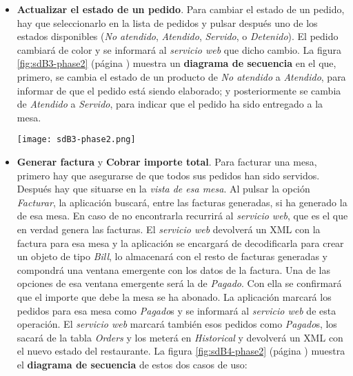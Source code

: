 \begin{itemize}
  \begin{sidewaysfigure}[!h]
    \begin{center}
      \texttt{[image: sdB2-phase2.png]}
      \caption{Diagrama de secuencia del caso de uso \emph{añadir un nuevo
      pedido (manual)}.}
      \label{fig:sdB2-phase2}
    \end{center}
  \end{sidewaysfigure}

\item \textbf{Actualizar el estado de un pedido}. Para cambiar el estado de
un pedido, hay que seleccionarlo en la lista de pedidos y pulsar después uno
de los estados disponibles (\emph{No atendido}, \emph{Atendido},
\emph{Servido}, o \emph{Detenido}). El pedido cambiará de color y se informará
al \emph{servicio web} que dicho cambio.
La figura \ref{fig:sdB3-phase2} (página \pageref{fig:sdB3-phase2}) muestra
un \textbf{diagrama de secuencia} en el que, primero, se cambia el estado de
un producto de \emph{No atendido} a \emph{Atendido}, para informar de que
el pedido está siendo elaborado; y posteriormente se cambia de \emph{Atendido}
a \emph{Servido}, para indicar que el pedido ha sido entregado a la mesa.

  \begin{sidewaysfigure}[!h]
    \begin{center}
      \texttt{[image: sdB3-phase2.png]}
      \caption{Diagrama de secuencia del caso de uso \emph{actualizar
      estado de un pedido} de \emph{No atendido} a \emph{Servido}.}
      \label{fig:sdB3-phase2}
    \end{center}
  \end{sidewaysfigure}

\item \textbf{Generar factura} y  \textbf{Cobrar importe total}. Para
facturar una mesa, primero hay que asegurarse de que todos sus pedidos han
sido servidos. Después hay que situarse en la \emph{vista de esa mesa}.
Al pulsar la opción \emph{Facturar}, la aplicación buscará, entre las facturas
generadas, si ha generado la de esa mesa. En caso de no encontrarla recurrirá
al \emph{servicio web}, que es el que en verdad genera las facturas. El
\emph{servicio web} devolverá un \acs{XML} con la factura para esa mesa y la 
aplicación se encargará de decodificarla para crear un objeto de tipo
\emph{Bill}, lo almacenará con el resto de facturas generadas y compondrá
una ventana emergente con los datos de la factura. Una de las opciones de
esa ventana emergente será la de \emph{Pagado}. Con ella se confirmará que
el importe que debe la mesa se ha abonado. La aplicación marcará los
pedidos para esa mesa como \emph{Pagado}s y se informará al \emph{servicio
web} de esta operación. El \emph{servicio web} marcará también esos pedidos
como \emph{Pagado}s, los sacará de la tabla \emph{Orders} y los meterá en
\emph{Historical} y devolverá un \acs{XML} con el nuevo estado del
restaurante. La figura \ref{fig:sdB4-phase2} (página \pageref{fig:sdB4-phase2})
muestra el \textbf{diagrama de secuencia} de estos dos casos de uso:


\end{itemize}
